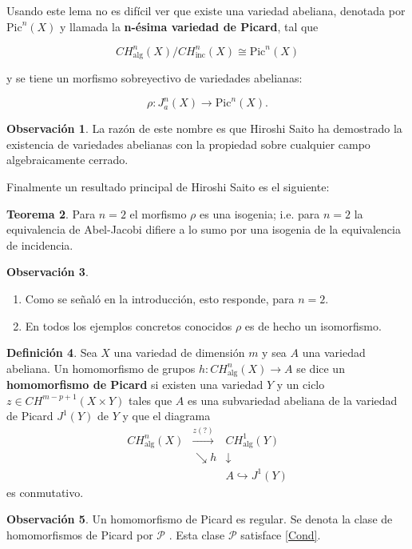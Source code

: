 \documentclass[10pt]{amsart}
\theoremstyle{definition}
\newtheorem{definition}{Definici\'on}[section]
\newtheorem{obs}[definition]{Observaci\'on}
\newtheorem{theorem}[definition]{Teorema}
\theoremstyle{remark}
\theoremstyle{definition}
\begin{document}
Usando este lema no es difícil ver que existe una variedad abeliana, denotada por \(\text{Pic}^n(X)\) y llamada la \textbf{n-ésima variedad de Picard}, tal que

\[
 CH^n_\mathrm{alg}(X) / CH^n_{\text{inc}}(X) \cong \text{Pic}^n(X)
\]

y se tiene un morfismo sobreyectivo de variedades abelianas:

\[
\rho: J_a^n(X) \rightarrow \text{Pic}^n(X).
\]

\begin{obs}
La razón de este nombre es que Hiroshi Saito ha demostrado la existencia de variedades abelianas con la propiedad sobre cualquier campo algebraicamente cerrado.
\end{obs}

Finalmente un resultado principal de Hiroshi Saito es el siguiente:

\begin{theorem}
Para \(n= 2\) el morfismo \(\rho\) es una isogenia; i.e. para \(n = 2\) la equivalencia de Abel-Jacobi difiere a lo sumo por una isogenia de la equivalencia de incidencia.
\end{theorem}

\begin{obs}
\begin{enumerate}
    \item Como se señaló en la introducción, esto responde, para \(n = 2\).
    \item En todos los ejemplos concretos conocidos \(\rho\) es de hecho un isomorfismo.
\end{enumerate}
\end{obs}

\begin{definition}
Sea \(X\) una variedad de dimensión \(m\) y sea \(A\) una variedad abeliana. Un homomorfismo de grupos $h: CH_{\text{alg}}^{n}(X) \to A$ se dice un \textbf{homomorfismo de Picard} si existen una variedad \(Y\) y un ciclo $z \in CH^{m-p+1}(X \times Y)$ tales que $A$ es una subvariedad abeliana de la variedad de Picard $J^1(Y)$ de $Y$ y que el diagrama
\[
\begin{array}{ccc}
CH_{\mathrm{alg}}^n(X) & \xrightarrow{z(?)} & CH_{\mathrm{alg}}^1(Y) \\
& \searrow h & \downarrow \\
& & A \hookrightarrow J^1(Y)
\end{array}
\]
es conmutativo.
\end{definition}
\begin{obs}\label{Pic}
Un homomorfismo de Picard es regular. Se denota la clase de homomorfismos de Picard por \(\mathcal{P}\)  \cite[Def. 3.1]{Sai79}. Esta clase \(\mathcal{P}\) satisface \ref{Cond}.
\end{obs}
\end{document}

